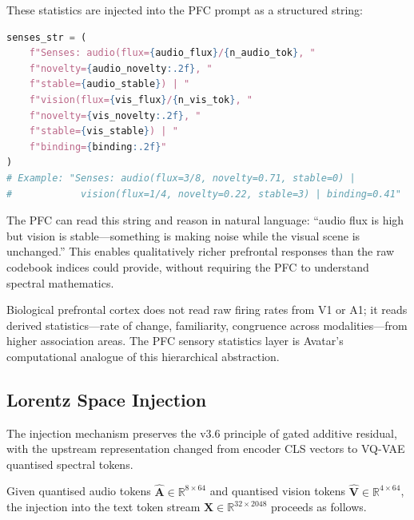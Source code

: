 These statistics are injected into the PFC prompt as a structured string:
\begin{lstlisting}[language=python,
    caption={PFC sensory statistics injection (v3.7).},
    label=lst:pfc_inject]
senses_str = (
    f"Senses: audio(flux={audio_flux}/{n_audio_tok}, "
    f"novelty={audio_novelty:.2f}, "
    f"stable={audio_stable}) | "
    f"vision(flux={vis_flux}/{n_vis_tok}, "
    f"novelty={vis_novelty:.2f}, "
    f"stable={vis_stable}) | "
    f"binding={binding:.2f}"
)
# Example: "Senses: audio(flux=3/8, novelty=0.71, stable=0) |
#            vision(flux=1/4, novelty=0.22, stable=3) | binding=0.41"
\end{lstlisting}

The PFC can read this string and reason in natural language: ``audio flux is high but
vision is stable---something is making noise while the visual scene is unchanged.''
This enables qualitatively richer prefrontal responses than the raw codebook indices
could provide, without requiring the PFC to understand spectral mathematics.

Biological prefrontal cortex does not read raw firing rates from V1 or A1; it reads
derived statistics---rate of change, familiarity, congruence across modalities---from
higher association areas.
The PFC sensory statistics layer is Avatar's computational analogue of this hierarchical
abstraction.

\subsection{Lorentz Space Injection}
\label{sec:spectral_injection}

The injection mechanism preserves the v3.6 principle of gated additive residual, with
the upstream representation changed from encoder CLS vectors to VQ-VAE quantised
spectral tokens.

Given quantised audio tokens $\hat{\mathbf{A}} \in \mathbb{R}^{8 \times 64}$ and
quantised vision tokens $\hat{\mathbf{V}} \in \mathbb{R}^{4 \times 64}$, the injection
into the text token stream $\mathbf{X} \in \mathbb{R}^{32 \times 2048}$ proceeds as
follows.

